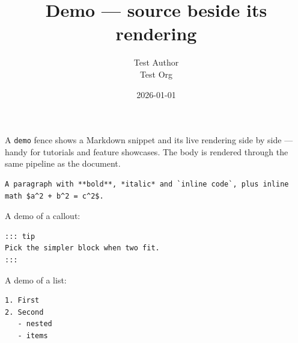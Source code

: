 \documentclass[11pt,a4paper]{article}
\title{Demo — source beside its rendering}
\author{Test Author \\ Test Org}
\date{2026-01-01}
\theoremstyle{definition}
\begin{document}
\maketitle

A \texttt{demo} fence shows a Markdown snippet and its live rendering side by
side — handy for tutorials and feature showcases. The body is rendered
through the same pipeline as the document.


\begin{lstlisting}
A paragraph with **bold**, *italic* and `inline code`, plus inline
math $a^2 + b^2 = c^2$.
\end{lstlisting}


A demo of a callout:


\begin{lstlisting}
::: tip
Pick the simpler block when two fit.
:::
\end{lstlisting}


A demo of a list:


\begin{lstlisting}
1. First
2. Second
   - nested
   - items
\end{lstlisting}
\end{document}

